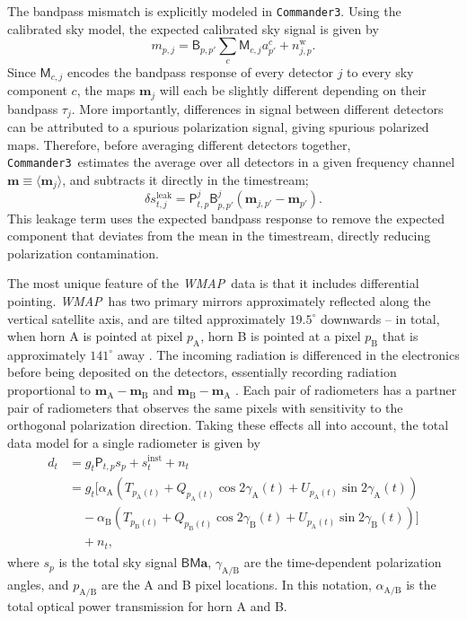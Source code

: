 \documentclass[twocolumn]{../../common/aa}
\def\WMAP{\emph{WMAP}}
\def\commanderthree{\texttt{Commander3}}
\newcommand{\A}[0]{\mathrm{A}}
\newcommand{\B}[0]{\mathrm{B}}
\begin{document}
The bandpass mismatch is explicitly modeled in \commanderthree. Using the calibrated sky model, the expected calibrated sky signal is given by
\begin{equation}
	m_{p,j}=\mathsf B_{p,p'}\sum_c\mathsf M_{c,j}a^c_{p'}+n_{j,p}^\mathrm w.
\end{equation}
Since $\mathsf M_{c,j}$ encodes the bandpass response of every detector $j$ to every sky component $c$, the maps $\boldsymbol m_j$ will each be slightly different depending on their bandpass $\tau_j$. More importantly, differences in signal between different detectors can be attributed to a spurious polarization signal, giving spurious polarized maps. Therefore, before averaging different detectors together, \commanderthree\ estimates the average over all detectors in a given frequency channel $\boldsymbol m\equiv \langle \boldsymbol m_j\rangle$, and subtracts it directly in the timestream;
\begin{equation}
	\delta s_{t,j}^\mathrm{leak}=\mathsf P_{t,p}^j\mathsf B_{p,p'}^j\left(\boldsymbol m_{j,p'}-\boldsymbol m_{p'}\right).
\end{equation}
This leakage term uses the expected bandpass response to remove the expected component that deviates from the mean in the timestream, directly reducing polarization contamination.


The most unique feature of the \WMAP\ data is that it includes differential pointing.  \WMAP\ has two primary mirrors approximately reflected along the vertical satellite axis, and are tilted approximately $19.5^\circ$ downwards -- in total, when horn A is pointed at pixel $p_\A$, horn B is pointed at a pixel $p_\B$ that is approximately $141^\circ$ away \citep{page2003:MAP}. The incoming radiation is differenced in the electronics before being deposited on the detectors, essentially recording radiation proportional to $\boldsymbol m_\A-\boldsymbol m_\B$ and $\boldsymbol m_\B-\boldsymbol m_\A$ \citep{jarosik2003:MAP}. Each pair of radiometers has a partner pair of radiometers that observes the same pixels with sensitivity to the orthogonal polarization direction. Taking these effects all into account, the total data model for a single radiometer is given by
\begin{align}
	d_{t}&=g_{t}\mathsf P_{t,p}s_{p} + s^\mathrm{inst}_t+n_t
	\\
	&=g_t\Big[\alpha_\A(T_{p_\A(t)}+Q_{p_\A(t)}\cos2\gamma_\A(t) + U_{p_\A(t)}\sin2\gamma_\A(t))
	\nonumber
	\\
	&\phantom{g_t\Big[}-
	\alpha_\B(T_{p_\B(t)}+Q_{p_\B(t)}\cos2\gamma_\B(t) + U_{p_\A(t)}\sin2\gamma_\B(t))\Big]
	\nonumber
	\\
	&\phantom{g_t\Big[}
	+n_t,
\end{align}
where $s_p$ is the total sky signal $\mathsf B\mathsf M\boldsymbol a$, $\gamma_{\A/\B}$ are the time-dependent polarization angles, and $p_{\A/\B}$ are the A and B pixel locations. In this notation, $\alpha_{\A/\B}$ is the total optical power transmission for horn A and B.
\end{document}
